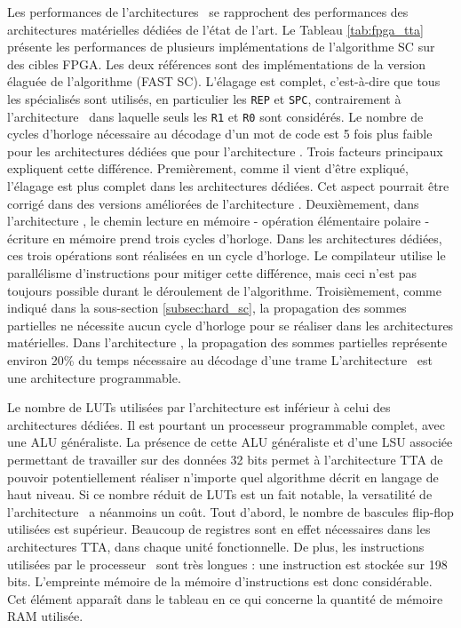 Les performances de l'architectures \TTSC~se rapprochent des performances des architectures matérielles dédiées de l'état de l'art. Le Tableau \ref{tab:fpga_tta} présente les performances de plusieurs implémentations de l'algorithme SC sur des cibles FPGA. Les deux références \cite{sarkis_fast_2014,giard_638_2015}sont des implémentations de la version élaguée de l'algorithme (FAST SC). L'élagage est complet, c'est-à-dire que tous les \noeuds spécialisés sont utilisés, en particulier les \noeuds \texttt{REP} et \texttt{SPC}, contrairement à l'architecture \TTSC~dans laquelle seuls les \noeuds \texttt{R1} et \texttt{R0} sont considérés. Le nombre de cycles d'horloge nécessaire au décodage d'un mot de code est 5 fois plus faible pour les architectures dédiées que pour l'architecture \TTSC. Trois facteurs principaux expliquent cette différence. Premièrement, comme il vient d'être expliqué, l'élagage est plus complet dans les architectures dédiées. Cet aspect pourrait être corrigé dans des versions améliorées de l'architecture \TTSC. Deuxièmement, dans l'architecture \TTSC, le chemin lecture en mémoire - opération élémentaire polaire - écriture en mémoire prend trois cycles d'horloge. Dans les architectures dédiées, ces trois opérations sont réalisées en un cycle d'horloge. Le compilateur utilise le parallélisme d'instructions pour mitiger cette différence, mais ceci n'est pas toujours possible durant le déroulement de l'algorithme. Troisièmement, comme indiqué dans la sous-section \ref{subsec:hard_sc}, la propagation des sommes partielles ne nécessite aucun cycle d'horloge pour se réaliser dans les architectures matérielles. Dans l'architecture \TTSC, la propagation des sommes partielles représente environ 20\% du temps nécessaire au décodage d'une trame
L'architecture \TTSC~est une architecture programmable. 


Le nombre de LUTs utilisées par l'architecture \TTSC est inférieur à celui des architectures dédiées. Il est pourtant un processeur programmable complet, avec une ALU généraliste. La présence de cette ALU généraliste et d'une LSU associée permettant de travailler sur des données 32 bits permet à l'architecture TTA de pouvoir potentiellement réaliser n'importe quel algorithme décrit en langage de haut niveau. Si ce nombre réduit de LUTs est un fait notable, la versatilité de l'architecture \TTSC~a néanmoins un coût. Tout d'abord, le nombre de bascules flip-flop utilisées est supérieur. Beaucoup de registres sont en effet nécessaires dans les architectures TTA, dans chaque unité fonctionnelle. De plus, les instructions utilisées par le processeur \TTSC~sont très longues : une instruction est stockée sur 198 bits. L'empreinte mémoire de la mémoire d'instructions est donc considérable. Cet élément apparaît dans le tableau en ce qui concerne la quantité de mémoire RAM utilisée.



